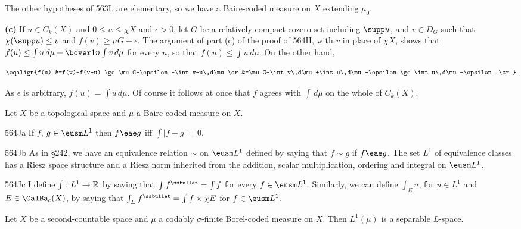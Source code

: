 {The other hypotheses of 563L are elementary, so we have a Baire-coded
measure on $X$ extending $\mu_0$.

\medskip

{\bf (c)} If $u\in C_k(X)$ and $0\le u\le\chi X$ and $\epsilon>0$,
let $G$ be a relatively
compact cozero set including $\supp u$, and $v\in D_G$ such that
$\chi(\supp u)\le v$ and $f(v)\ge\mu G-\epsilon$.   The argument of
part (c) of the proof of 564H, with $v$ in place of $\chi X$, shows that
$f(u)\le\int u\,d\mu+\bover1n\int v\,d\mu$ for every $n$, so that
$f(u)\le\int u\,d\mu$.   On the other hand,

$$\eqalign{f(u)
&=f(v)-f(v-u)
\ge\mu G-\epsilon-\int v-u\,d\mu\cr
&=\mu G-\int v\,d\mu+\int u\,d\mu-\epsilon
\ge\int u\,d\mu-\epsilon.\cr}$$

\noindent As $\epsilon$ is arbitrary, $f(u)=\int u\,d\mu$.   Of course it
follows at once that $f$ agrees with $\int\,d\mu$ on the whole of $C_k(X)$.
}%

 Let $X$ be a topological space and
$\mu$ a Baire-coded measure on $X$.

\spheader 564Ja If $f$, $g\in\eusm L^1$ then $f\eae g$ iff $\int|f-g|=0$.

\spheader 564Jb As in \S242, we have an equivalence
relation $\sim$ on $\eusm L^1$ defined by saying that $f\sim g$ if
$f\eae g$.   The set $L^1$ of equivalence classes has a Riesz space
structure and a Riesz norm inherited from the addition, scalar
multiplication, ordering and integral on $\eusm L^1$.

\spheader 564Jc I define 
$\int:L^1\to\Bbb R$ by saying
that $\int f^{\ssbullet}=\int f$ for every $f\in\eusm L^1$.   Similarly, we
can define $\int_Eu$, for $u\in L^1$ and $E\in\CalBa_c(X)$, by saying that
$\int_Ef^{\ssbullet}=\int f\times\chi E$ for $f\in\eusm L^1$.

 Let $X$ be a second-countable space and $\mu$ a
codably $\sigma$-finite Borel-coded measure on $X$.   Then $L^1(\mu)$ is a
separable $L$-space.

